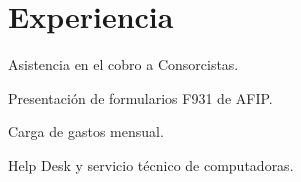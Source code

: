 \documentclass[letterpaper]{deedy-resume} %
\begin{document}
\begin{minipage}[t]{0.57\textwidth} %


\section{Experiencia}


\vspace{\topsep} %
\begin{tightitemize}
\item Asistencia en el cobro a Consorcistas.  
\item Presentación de formularios F931 de AFIP.
\item Carga de gastos mensual.
\item Help Desk y servicio técnico de computadoras.
\end{tightitemize}

\sectionspace %









\end{minipage}
\end{document}
